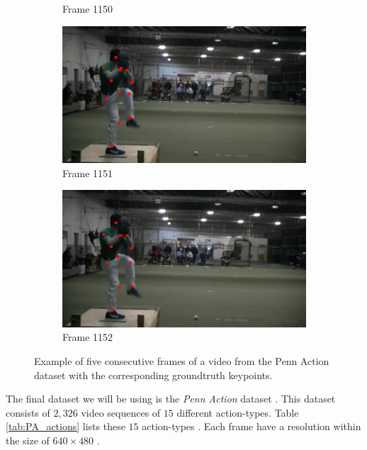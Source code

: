 \documentclass[./main.tex]{subfiles}
\begin{document}
\begin{figure}[htbp]
\begin{subfigure}{0.45\textwidth}
        \caption{Frame 1150}
    \end{subfigure}
    \begin{subfigure}{0.45\textwidth}
        \centering
        \includegraphics[width=\textwidth]{entities/PA_63.png}
        \caption{Frame 1151}
    \end{subfigure}
    \begin{subfigure}{0.45\textwidth}
        \centering
        \includegraphics[width=\textwidth]{entities/PA_64.png}
        \caption{Frame 1152}
    \end{subfigure}
    \caption{Example of five consecutive frames of a video from the Penn Action dataset with the corresponding groundtruth keypoints.}
    \label{fig:PA_dataset}
\end{figure}
The final dataset we will be using is the \textit{Penn Action} dataset \cite{penn_action}. This dataset consists of $2,326$ video sequences of $15$ different action-types. Table \ref{tab:PA_actions} lists these $15$ action-types \cite{penn_action}. Each frame have a resolution within the size of $640 \times 480$ \cite{penn_action}.
\\
\end{document}
